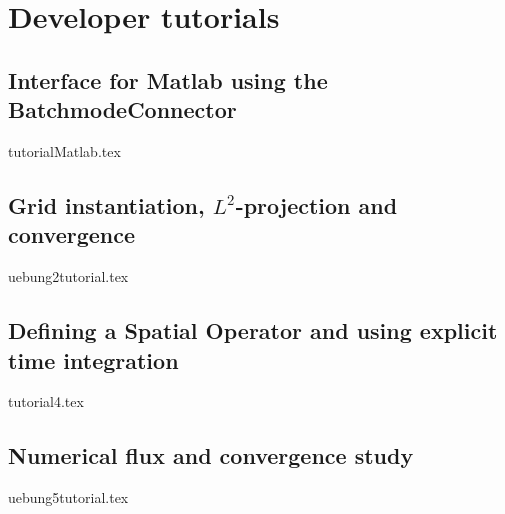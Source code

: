 \documentclass[a4paper,10pt]{report} %
\begin{document}
\part{Developer tutorials}
\label{sec:Tutorial}

\chapter{Interface for Matlab using the BatchmodeConnector}
\label{Matlab}
{tutorialMatlab.tex}

\chapter{Grid instantiation, $L^2$-projection and convergence}
\label{GridInstantiation}
{uebung2tutorial.tex}

\chapter{Defining a Spatial Operator and using explicit time integration}
\label{SpatialOperator}
{tutorial4.tex}


\chapter{Numerical flux and convergence study}
\label{NumFlux}
{uebung5tutorial.tex}
\end{document}

